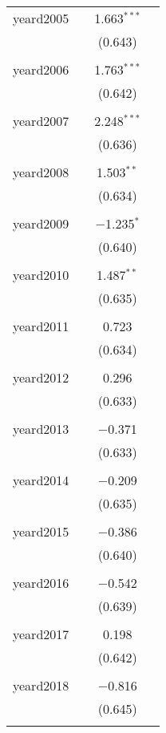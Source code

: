 \begin{table}[!htbp]
\begin{tabular}{@{\extracolsep{5pt}}lccc}
 yeard2005 &  & 1.663$^{***}$ &  \\ 
  &  & (0.643) &  \\ 
  & & & \\ 
 yeard2006 &  & 1.763$^{***}$ &  \\ 
  &  & (0.642) &  \\ 
  & & & \\ 
 yeard2007 &  & 2.248$^{***}$ &  \\ 
  &  & (0.636) &  \\ 
  & & & \\ 
 yeard2008 &  & 1.503$^{**}$ &  \\ 
  &  & (0.634) &  \\ 
  & & & \\ 
 yeard2009 &  & $-$1.235$^{*}$ &  \\ 
  &  & (0.640) &  \\ 
  & & & \\ 
 yeard2010 &  & 1.487$^{**}$ &  \\ 
  &  & (0.635) &  \\ 
  & & & \\ 
 yeard2011 &  & 0.723 &  \\ 
  &  & (0.634) &  \\ 
  & & & \\ 
 yeard2012 &  & 0.296 &  \\ 
  &  & (0.633) &  \\ 
  & & & \\ 
 yeard2013 &  & $-$0.371 &  \\ 
  &  & (0.633) &  \\ 
  & & & \\ 
 yeard2014 &  & $-$0.209 &  \\ 
  &  & (0.635) &  \\ 
  & & & \\ 
 yeard2015 &  & $-$0.386 &  \\ 
  &  & (0.640) &  \\ 
  & & & \\ 
 yeard2016 &  & $-$0.542 &  \\ 
  &  & (0.639) &  \\ 
  & & & \\ 
 yeard2017 &  & 0.198 &  \\ 
  &  & (0.642) &  \\ 
  & & & \\ 
 yeard2018 &  & $-$0.816 &  \\ 
  &  & (0.645) &  \\ 
  & & & \\ 

\end{tabular}
\end{table}
